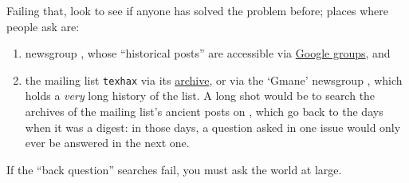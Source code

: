 Failing that, look to see if anyone has solved the problem before;
places where people ask are:
\begin{enumerate}
\item newsgroup , whose ``historical posts''
  are accessible via
  \href{http://groups.google.com/group/comp.text.tex}{Google groups},
  and
\item the mailing list \texttt{texhax} via its
  \href{http://tug.org/pipermail/texhax/}{archive}, or via the `Gmane'
  newsgroup , which holds a
  \emph{very} long history of the list.  A long shot would be to
  search the archives of the mailing list's ancient posts on
  , which go back to the days when it was a digest: in
  those days, a question asked in one issue would only ever be
  answered in the next one.
\end{enumerate}
If the ``back question'' searches fail, you must ask the world at
large.

